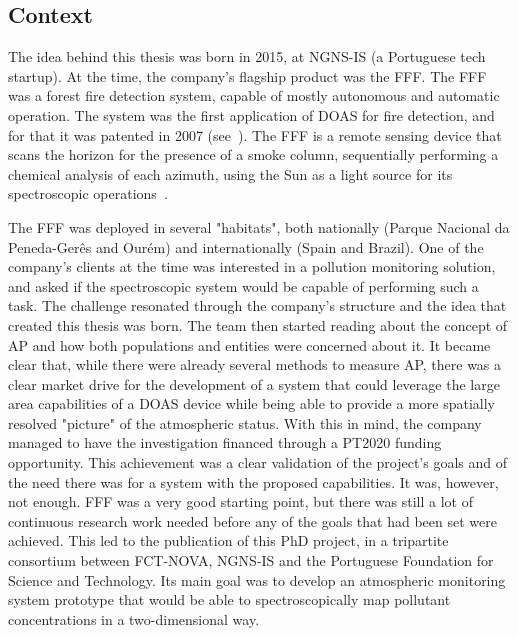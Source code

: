 \subsection{Context}%
\label{sub:context}

The idea behind this thesis was born in 2015, at NGNS-IS (a Portuguese
tech startup). At the time, the company's flagship product was the
\gls{FFF}. The \gls{FFF} was a forest fire detection system, capable of
mostly autonomous and automatic operation.  The system was the first
application of \gls{DOAS} for fire detection, and for that it was
patented in 2007 (see~\cite{Vieira2007, Application2008}). The \gls{FFF}
is a remote sensing device that scans the horizon for the presence of a
smoke column, sequentially performing a chemical analysis of each
azimuth, using the Sun as a light source for its spectroscopic
operations~\cite{ValentedeAlmeida2017}.

The \gls{FFF} was deployed in several "habitats", both nationally
(Parque Nacional da Peneda-Gerês and Ourém) and internationally (Spain
and Brazil). One of the company's clients at the time was interested in
a pollution monitoring solution, and asked if the spectroscopic system
would be capable of performing such a task. The challenge resonated
through the company's structure and the idea that created this thesis
was born. The team then started reading about the concept of \gls{AP}
and how both populations and entities were concerned about it. It became
clear that, while there were already several methods to measure
\gls{AP}, there was a clear market drive for the development of a system
that could leverage the large area capabilities of a \gls{DOAS} device
while being able to provide a more spatially resolved "picture" of the
atmospheric status. With this in mind, the company managed to have the
investigation financed through a \gls{PT2020} funding opportunity. This
achievement was a clear validation of the project's goals and of the
need there was for a system with the proposed capabilities. It was,
however, not enough. \gls{FFF} was a very good starting point, but there
was still a lot of continuous research work needed before any of the
goals that had been set were achieved. This led to the publication of
this PhD project, in a tripartite consortium between FCT-NOVA, NGNS-IS
and the Portuguese Foundation for Science and Technology. Its main goal
was to develop an atmospheric monitoring system prototype that would be
able to spectroscopically map pollutant concentrations in a
two-dimensional way.

